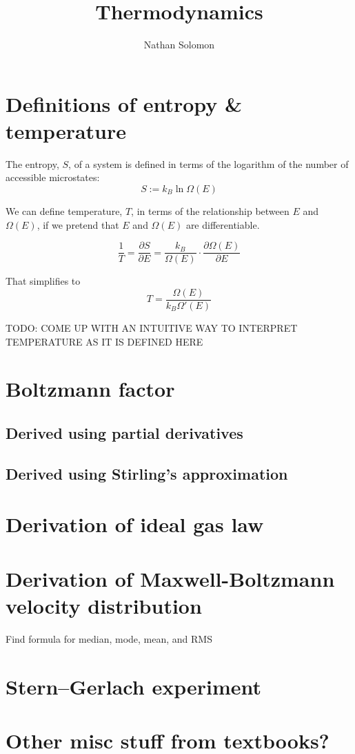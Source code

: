 \documentclass[12pt]{article}
\begin{document}
\title{Thermodynamics}
\author{Nathan Solomon}
\maketitle

\section{Definitions of entropy \& temperature}
The entropy, $S$, of a system is defined in terms of the logarithm of the number of accessible microstates:
\[S := k_B \ln{\Omega(E)}\]

We can define temperature, $T$, in terms of the relationship between $E$ and $\Omega(E)$, if we pretend that $E$ and $\Omega(E)$ are differentiable.

\[\frac{1}{T} = \frac{\partial S}{\partial E} = \frac{k_B}{\Omega(E)} \cdot \frac{\partial \Omega(E)}{\partial E}\]

That simplifies to
\[T = \frac{\Omega(E)}{k_B \Omega'(E)}\]

TODO: COME UP WITH AN INTUITIVE WAY TO INTERPRET TEMPERATURE AS IT IS DEFINED HERE


\section{Boltzmann factor}
\subsection{Derived using partial derivatives}
\subsection{Derived using Stirling's approximation}


\section{Derivation of ideal gas law}

\section{Derivation of Maxwell-Boltzmann velocity distribution}
Find formula for median, mode, mean, and RMS

\section{Stern–Gerlach experiment}

\section{Other misc stuff from textbooks?}
\end{document}
